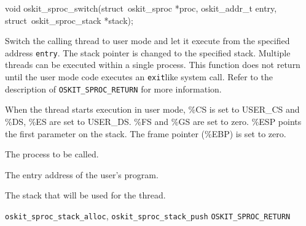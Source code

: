 \begin{apisyn}

        \funcproto void            oskit_sproc_switch(struct~oskit_sproc *proc, oskit_addr_t entry,
                                   struct~oskit_sproc_stack *stack);

\end{apisyn}
\begin{apidesc}
        Switch the calling thread to user mode and let it
        execute from the specified address \texttt{entry}.  The stack pointer
        is changed to the specified stack.  Multiple threads can be
        executed within a single process.  This function does not
        return until the user mode code executes an \texttt{exit}\-like
        system call.  Refer to the description of
        \texttt{OSKIT_SPROC_RETURN} for more information.

        When the thread starts execution in user mode, \%CS is set to
        USER_CS and \%DS, \%ES are set to USER_DS.  \%FS and \%GS are
        set to zero.  \%ESP points the first parameter on the stack.
        The frame pointer (\%EBP) is set to zero.  


\end{apidesc}
\begin{apiparm}
        \item[proc]
                The process to be called.

        \item[entry]
                The entry address of the user's program.

        \item[stack]
                The stack that will be used for the thread.

\end{apiparm}
\begin{apirel}
        {\tt oskit_sproc_stack_alloc}, {\tt oskit_sproc_stack_push}
        {\tt OSKIT_SPROC_RETURN}
\end{apirel}

